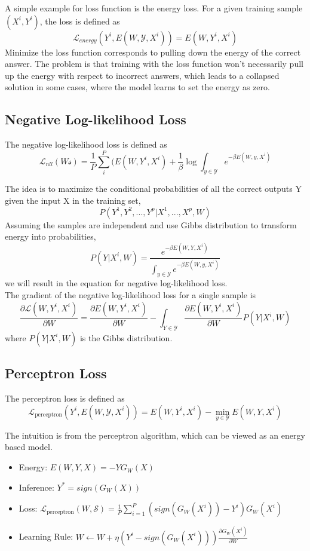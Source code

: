 A simple example for loss function is the energy loss. For a given training sample
$(X^i,Y^i)$, the loss is defined as
\[
    \mathcal{L}_{energy}(Y^i, E(W, \mathcal{Y}, X^i)) = E(W, Y^i, X^i)    
\]
Minimize the loss function corresponds to pulling down the energy of 
the correct answer. The problem is that training with the loss function won't
necessarily pull up the energy with respect to incorrect answers, which 
leads to a collapsed solution in some cases, 
where the model learns to set the energy as zero. 

\subsection{Negative Log-likelihood Loss}

The negative log-likelihood loss is defined as
\[
    \mathcal{L}_{nll}(W \mathcal{s}) = \frac{1}{P} \sum_i^P (E(W, Y^i, X^i) 
    + \frac{1}{\beta} \log \int_{y \in \mathcal{Y}} e^{-\beta E(W, y, X^i)}
\]

The idea is to maximize the conditional probabilities of all the
correct outputs Y given the input X in the training set, 
\[
    P(Y^1, Y^2, ..., Y^p |X^1, ..., X^p, W)
\]
Assuming the samples are independent and use Gibbs distribution
to transform energy into probabilities,
\[
    P(Y|X^i, W) = \frac{e^{-\beta E(W, Y, X^i)}}
    {\int_{y \in \mathcal{Y}}e^{-\beta E(W, y, X^i)}}    
\]
we will result in the equation
for negative log-likelihood loss.\\

The gradient of the negative log-likelihood loss for a single sample is 
\[
    \frac{\partial{\mathcal{L}(W, Y^i, X^i)}}{\partial{W}}
    = \frac{\partial{E(W, Y^i, X^i)}}{\partial{W}}
    - \int_{Y \in \mathcal{Y}} \frac{\partial{E(W, Y^i, X^i)}}{\partial{W}} P(Y|X^i, W)
\]
where $P(Y|X^i, W)$ is the Gibbs distribution.\\

\subsection{Perceptron Loss}

The perceptron loss is defined as 
\[
    \mathcal{\mathcal{L}}_{\text{perceptron}}(Y^i, E(W,\mathcal{Y}, X^i))
    = E(W, Y^i, X^i) - \min_{y \in \mathcal{Y}} E(W, Y, X^i)
\]

The intuition is from the perceptron algorithm,
which can be viewed as an energy based model.
\begin{itemize}
    \item Energy: $E(W, Y, X) = -YG_W(X)$
    \item Inference: $Y^* = sign(G_W(X))$
    \item Loss: $\mathcal{\mathcal{L}}_{\text{perceptron}}(W, \mathcal{S})
     = \frac{1}{P} \sum_{i=1}^P(sign(G_W(X^i))-Y^i)G_W(X^i)$
    \item Learning Rule: $W \leftarrow W + \eta (Y^i -sign(G_W(X^i)))
    \frac{\partial{G_W(X^i)}}{\partial{W}}$
\end{itemize}

